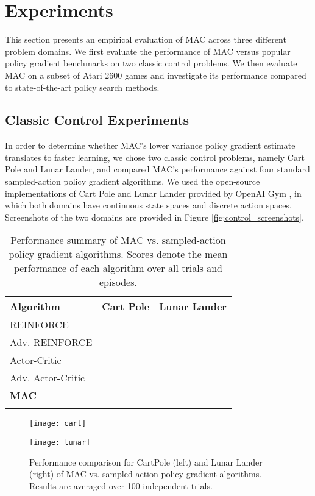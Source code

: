 \documentclass[letterpaper]{article}
\begin{document}
\section{Experiments}
This section presents an empirical evaluation of MAC across three different problem domains. We first evaluate the performance of MAC versus popular policy gradient benchmarks on two classic control problems. We then evaluate MAC on a subset of Atari 2600 games and investigate its performance compared to state-of-the-art policy search methods.


\subsection{Classic Control Experiments}
In order to determine whether MAC's lower variance policy gradient estimate translates to faster learning, we chose two classic control problems, namely Cart Pole and Lunar Lander, and compared MAC's performance against four standard sampled-action policy gradient algorithms. We used the open-source implementations of Cart Pole and Lunar Lander provided by OpenAI Gym \cite{DBLP:journals/corr/BrockmanCPSSTZ16}, in which both domains have continuous state spaces and discrete action spaces. Screenshots of the two domains are provided in Figure \ref{fig:control_screenshots}.

\begin{table}[t]
  \centering
  \begin{tabular}{lll}
    \toprule
    \textbf{Algorithm} & \textbf{Cart Pole} & \textbf{Lunar Lander} \\
    \midrule
    REINFORCE &  &  \\
    Adv. REINFORCE &  &  \\
    Actor-Critic &  &  \\
    Adv. Actor-Critic &  &  \\
    \textbf{MAC} &  &  \\
    \bottomrule\\
  \end{tabular}
  \caption{Performance summary of MAC vs. sampled-action policy gradient algorithms. Scores denote the mean performance of each algorithm over all trials and episodes.}
  \label{tbl:control_results}
\end{table}

\begin{figure*}[t]
\centering
\parbox{8cm}{
\texttt{[image: cart]}
\label{fig:cart_results}}
\qquad
\begin{minipage}{8cm}
\texttt{[image: lunar]}
\label{fig:lunar_results}
\end{minipage}
\caption{Performance comparison for CartPole (left) and Lunar Lander (right) of MAC vs. sampled-action policy gradient algorithms. Results are averaged over 100 independent trials.}
\label{fig:control_results}
\end{figure*}
\end{document}

